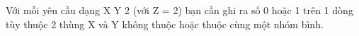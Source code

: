 Với mỗi yêu cầu dạng X Y 2 (với Z = 2) bạn cần ghi ra số 0 hoặc 1 trên 1 dòng tùy thuộc 2 thùng X và Y không thuộc hoặc thuộc cùng một nhóm bình.